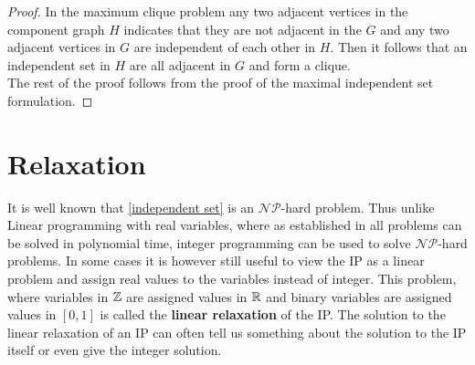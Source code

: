 \begin{example}
\begin{proof}
\noindent In the maximum clique problem any two adjacent vertices in the component graph $H$ indicates that they are not adjacent in the $G$ and any two adjacent vertices in $G$ are independent of each other in $H$. Then it follows that an independent set in $H$ are all adjacent in $G$ and form a clique. \\
The rest of the proof follows from the proof of the maximal independent set formulation.
\end{proof}
\end{example}
\section{Relaxation}\label{relaxation}
It is well known that \ref{independent set} is an $\mathcal{NP}$-hard problem. Thus unlike Linear programming with real variables, where as established in  all problems can be solved in polynomial time, integer programming can be used to solve $\mathcal{NP}$-hard problems. In some cases it is however still useful to view the IP as a linear problem and assign real values to the variables instead of integer. This problem, where variables in $\mathbb{Z}$ are assigned values in $\mathbb{R}$ and binary variables are assigned values in $[0,1]$ is called the \textbf{linear relaxation} of the IP. The solution to the linear relaxation of an IP can often tell us something about the solution to the IP itself or even give the integer solution.

